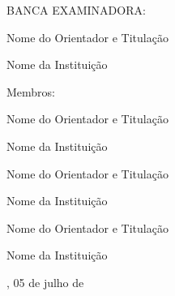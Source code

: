 

% 

\begin{folhadeaprovacao}



	\begin{center}
		{\selectfont\MakeTextUppercase{\normalsize\imprimirautor}}
	\end{center}
    \vfill
    
	\vfill
	\begin{center}
		{\selectfont\MakeTextUppercase{\imprimirtitulo}}
	\end{center}
	\vfill

    
%


\vfill
        
	 \begin{center}
	 	
    	{\selectfont BANCA EXAMINADORA: }
    	\vspace*{1.75cm}
    
		Nome do Orientador e Titulação \par
		Nome da Instituição
	 \end{center}
	
    {Membros:} 
    
	\begin{center}
		\vspace*{1.25cm}
		Nome do Orientador e Titulação \par
		Nome da Instituição
		
		\vspace*{1.25cm}
		Nome do Orientador e Titulação \par
		Nome da Instituição
		
		\vspace*{1.25cm}
		Nome do Orientador e Titulação \par
		Nome da Instituição

	
	\end{center}
    
    \vspace*{\fill}  
    \begin{center}
    {\imprimirlocal, 05 de julho de \imprimirdata}
	\end{center}
    \vspace*{0.25cm}  
\end{folhadeaprovacao}